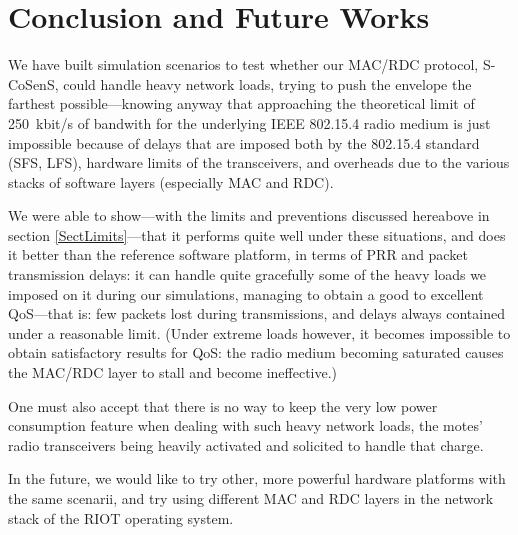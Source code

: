 \documentclass[conference]{IEEEtran}
\begin{document}

\section{Conclusion and Future Works}

We have built simulation scenarios to test whether our MAC/RDC protocol,
S-CoSenS, could handle heavy network loads, trying to push the envelope
the farthest possible---knowing anyway that approaching the theoretical
limit of 250~kbit/s of bandwith for the underlying IEEE 802.15.4 radio
medium is just impossible because of delays that are imposed both by
the 802.15.4 standard (SFS, LFS), hardware limits of the transceivers,
and overheads due to the various stacks of software layers (especially
MAC and RDC).

We were able to show---with the limits and preventions discussed hereabove
in section \ref{SectLimits}---that it performs quite well under these
situations, and does it better than the reference software platform, in terms
of PRR and packet transmission delays: it can handle quite gracefully some of
the heavy loads we imposed on it during our simulations, managing to obtain
a good to excellent QoS---that is: few packets lost during transmissions,
and delays always contained under a reasonable limit.
(Under extreme loads however, it becomes impossible to obtain satisfactory
results for QoS: the radio medium becoming saturated causes the MAC/RDC
layer to stall and become ineffective.)

One must also accept that there is no way to keep the very low power
consumption feature when dealing with such heavy network loads, the
motes' radio transceivers being heavily activated and solicited to
handle that charge.

\bigskip

In the future, we would like to try other, more powerful hardware platforms
with the same scenarii, and try using different MAC and RDC layers in
the network stack of the RIOT operating system.





\vfill

{\small
}
\end{document}
